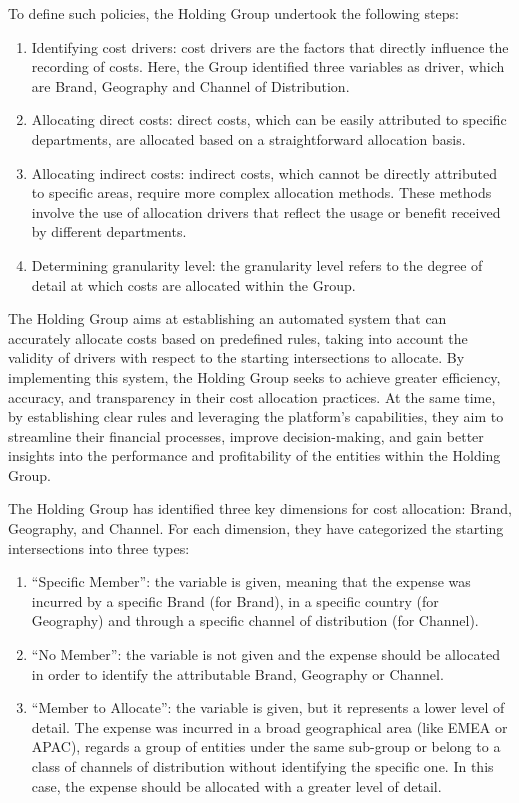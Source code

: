 \documentclass[12pt,a4paper,openright,twoside]{book}
\begin{document}
To define such policies, the Holding Group undertook the following steps:

\begin{enumerate}
    \item Identifying cost drivers: cost drivers are the factors that directly influence the recording of costs. Here, the Group identified three variables as driver, which are Brand, Geography and Channel of Distribution.
    \item Allocating direct costs: direct costs, which can be easily attributed to specific departments, are allocated based on a straightforward allocation basis.
    \item Allocating indirect costs: indirect costs, which cannot be directly attributed to specific areas, require more complex allocation methods. These methods involve the use of allocation drivers that reflect the usage or benefit received by different departments.
    \item Determining granularity level: the granularity level refers to the degree of detail at which costs are allocated within the Group. 
\end{enumerate}

The Holding Group aims at establishing an automated system that can accurately allocate costs based on predefined rules, taking into account the validity of drivers with respect to the starting intersections to allocate.
%
By implementing this system, the Holding Group seeks to achieve greater efficiency, accuracy, and transparency in their cost allocation practices.
%
At the same time,  by establishing clear rules and leveraging the platform's capabilities, they aim to streamline their financial processes, improve decision-making, and gain better insights into the performance and profitability of the entities within the Holding Group.

The Holding Group has identified three key dimensions for cost allocation: Brand, Geography, and Channel. 
%
For each dimension, they have categorized the starting intersections into three types: 

\begin{enumerate}
    \item ``Specific Member'': the variable is given, meaning that the expense was incurred by a specific Brand (for Brand), in a specific country (for Geography) and through a specific channel of distribution (for Channel).
    \item ``No Member'': the variable is not given and the expense should be allocated in order to identify the attributable Brand, Geography or Channel.
    \item ``Member to Allocate'': the variable is given, but it represents a lower level of detail. The expense was incurred in a broad geographical area (like EMEA or APAC), regards a group of entities under the same sub-group or belong to a class of channels of distribution without identifying the specific one. In this case, the expense should be allocated with a greater level of detail.
\end{enumerate}
\end{document}
